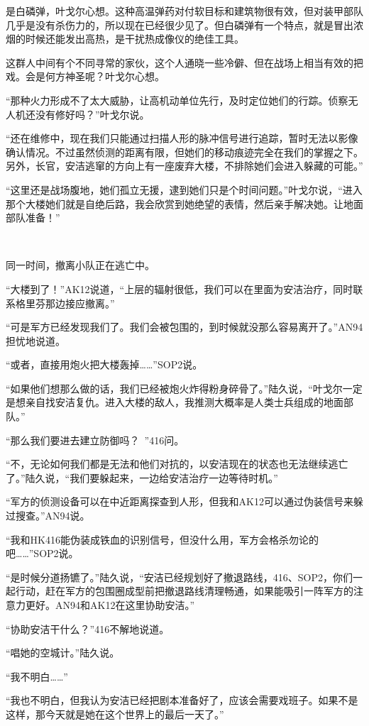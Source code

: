 是白磷弹，叶戈尔心想。这种高温弹药对付软目标和建筑物很有效，但对装甲部队几乎是没有杀伤力的，所以现在已经很少见了。但白磷弹有一个特点，就是冒出浓烟的时候还能发出高热，是干扰热成像仪的绝佳工具。

这群人中间有个不同寻常的家伙，这个人通晓一些冷僻、但在战场上相当有效的把戏。会是何方神圣呢？叶戈尔心想。

“那种火力形成不了太大威胁，让高机动单位先行，及时定位她们的行踪。侦察无人机还没有修好吗？”叶戈尔说。

“还在维修中，现在我们只能通过扫描人形的脉冲信号进行追踪，暂时无法以影像确认情况。不过虽然侦测的距离有限，但她们的移动痕迹完全在我们的掌握之下。另外，长官，安洁逃窜的方向上有一座废弃大楼，不排除她们会进入躲藏的可能。”

“这里还是战场腹地，她们孤立无援，逮到她们只是个时间问题。”叶戈尔说，“进入那个大楼她们就是自绝后路，我会欣赏到她绝望的表情，然后亲手解决她。让地面部队准备！”

 

同一时间，撤离小队正在逃亡中。

“大楼到了！”AK12说道，“上层的辐射很低，我们可以在里面为安洁治疗，同时联系格里芬那边接应撤离。”

“可是军方已经发现我们了。我们会被包围的，到时候就没那么容易离开了。”AN94担忧地说道。

“或者，直接用炮火把大楼轰掉……”SOP2说。

“如果他们想那么做的话，我们已经被炮火炸得粉身碎骨了。”陆久说，“叶戈尔一定是想亲自找安洁复仇。进入大楼的敌人，我推测大概率是人类士兵组成的地面部队。”

“那么我们要进去建立防御吗？ ”416问。

“不，无论如何我们都是无法和他们对抗的，以安洁现在的状态也无法继续逃亡了。”陆久说，“我们要躲起来，一边给安洁治疗一边等待时机。”

“军方的侦测设备可以在中近距离探查到人形，但我和AK12可以通过伪装信号来躲过搜查。”AN94说。

“我和HK416能伪装成铁血的识别信号，但没什么用，军方会格杀勿论的吧……”SOP2说。

“是时候分道扬镳了。”陆久说，“安洁已经规划好了撤退路线，416、SOP2，你们一起行动，赶在军方的包围圈成型前把撤退路线清理畅通，如果能吸引一阵军方的注意力更好。AN94和AK12在这里协助安洁。”

“协助安洁干什么？”416不解地说道。

“唱她的空城计。”陆久说。

“我不明白……”

“我也不明白，但我认为安洁已经把剧本准备好了，应该会需要戏班子。如果不是这样，那今天就是她在这个世界上的最后一天了。”

